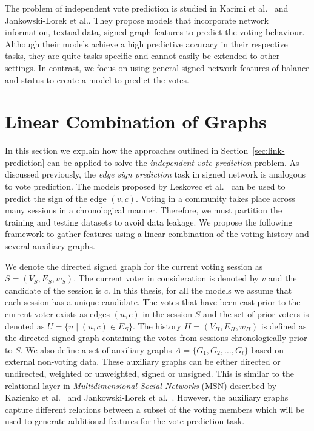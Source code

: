 The problem of independent vote prediction is studied in Karimi et al.\ \cite{karimi2019multicongress} and Jankowski-Lorek et al.\cite{jankowski-lorek2013MBSN}.
They propose models that incorporate network information, textual data, signed graph features to predict the voting behaviour.
Although their models achieve a high predictive accuracy in their respective tasks, they are quite tasks specific and cannot easily be extended to other settings.
In contrast, we focus on using general signed network features of balance and status to create a model to predict the votes. 

\fi

\section{Linear Combination of Graphs}
\label{sec:linear-combination-theory}

In this section we explain how the approaches outlined in Section~\ref{sec:link-prediction} can be applied to solve the \textit{independent vote prediction} problem.
As discussed previously, the \textit{edge sign prediction} task in signed network is analogous to vote prediction.
The models proposed by Leskovec et al.\ \cite{leskovec2010predicting} can be used to predict the sign of the edge $(v,c)$.
Voting in a community takes place across many sessions in a chronological manner.
Therefore, we must partition the training and testing datasets to avoid data leakage.
We propose the following framework to gather features using a linear combination of the voting history and several auxiliary graphs.

We denote the directed signed graph for the current voting session as $S=(V_S,E_S,w_S)$.
The current voter in consideration is denoted by $v$ and the candidate of the session is $c$.
In this thesis, for all the models we assume that each session has a unique candidate.
The votes that have been cast prior to the current voter exists as edges $(u,c)$ in the session $S$ and the set of prior voters is denoted as $U =\{u \mid (u,c) \in E_S\}$.
The history $H=(V_H,E_H,w_H)$ is defined as the directed signed graph containing the votes from sessions chronologically prior to $S$.
We also define a set of auxiliary graphs $A = \{G_1,G_2,\dots,G_l\}$ based on external non-voting data.
These auxiliary graphs can be either directed or undirected, weighted or unweighted, signed or unsigned.
This is similar to the relational layer in \textit{Multidimensional Social Networks} (MSN) described by Kazienko et al.\ \cite{kazienko2011multidimensional} and Jankowski-Lorek et al.\ \cite{jankowski-lorek2013MBSN}.
However, the auxiliary graphs capture different relations between a subset of the voting members which will be used to generate additional features for the vote prediction task. 

